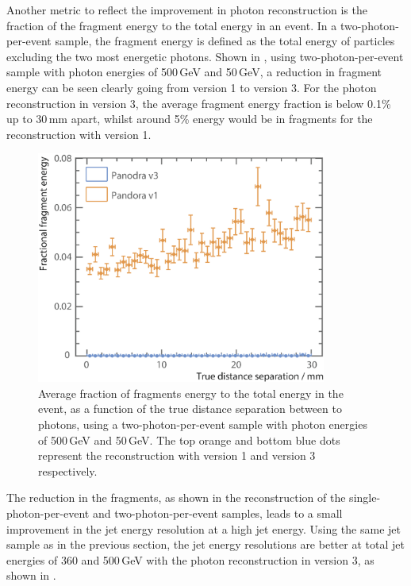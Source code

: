 Another metric to reflect the improvement in photon reconstruction is the fraction of the fragment energy to the total energy in an event. In a two-photon-per-event sample, the fragment energy is defined as the total energy of particles excluding the two most energetic photons. Shown in , using two-photon-per-event sample with photon energies of  500\,GeV and 50\,GeV, a reduction in fragment energy can be seen clearly going from \pandora version 1 to version 3. For the photon reconstruction in \pandora version 3, the average fragment energy fraction is below 0.1\% up to 30\,mm apart, whilst around 5\% energy would be in fragments for the reconstruction with \pandora version 1.
\begin{figure}[tbph]
\centering
\includegraphics[width=0.85\textwidth]{photon/DoubleCompareFragEnergy3}
\caption[Average fraction fragments energy to the total energy, as a function of the MC distance separation]
{Average fraction of fragments energy to the total energy  in the event, as a function of the true distance separation between to photons, using a two-photon-per-event sample with photon energies of  500\,GeV and 50\,GeV. The top orange and bottom blue dots represent the reconstruction with \pandora version 1 and version 3 respectively. }
\label{fig:photonDoubleFragEnergy}
\end{figure}



The reduction in the fragments, as shown in the reconstruction of the single-photon-per-event and two-photon-per-event samples, leads to a small improvement in the jet energy resolution at a high jet energy. Using the same jet sample as in the previous section, the jet energy resolutions are better at total jet energies of 360 and 500\,GeV with the  photon reconstruction in \pandora version 3, as shown in .

